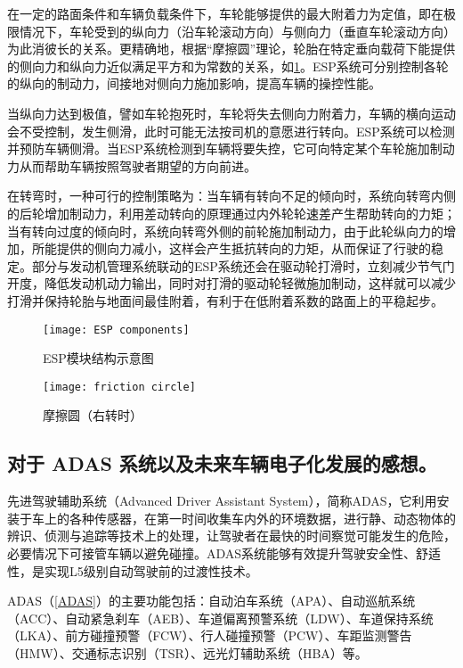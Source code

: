 \documentclass[UTF8]{ctexart}
\numberwithin{figure}{section}
\numberwithin{table}{section}
\begin{document}
在一定的路面条件和车辆负载条件下，车轮能够提供的最大附着力为定值，即在极限情况下，车轮受到的纵向力（沿车轮滚动方向）与侧向力（垂直车轮滚动方向）为此消彼长的关系。更精确地，根据“摩擦圆”理论，轮胎在特定垂向载荷下能提供的侧向力和纵向力近似满足平方和为常数的关系，如\cref{friction circle}。ESP系统可分别控制各轮的纵向的制动力，间接地对侧向力施加影响，提高车辆的操控性能。

当纵向力达到极值，譬如车轮抱死时，车轮将失去侧向力附着力，车辆的横向运动会不受控制，发生侧滑，此时可能无法按司机的意愿进行转向。ESP系统可以检测并预防车辆侧滑。当ESP系统检测到车辆将要失控，它可向特定某个车轮施加制动力从而帮助车辆按照驾驶者期望的方向前进。

在转弯时，一种可行的控制策略为：当车辆有转向不足的倾向时，系统向转弯内侧的后轮增加制动力，利用差动转向的原理通过内外轮轮速差产生帮助转向的力矩；当有转向过度的倾向时，系统向转弯外侧的前轮施加制动力，由于此轮纵向力的增加，所能提供的侧向力减小，这样会产生抵抗转向的力矩，从而保证了行驶的稳定。部分与发动机管理系统联动的ESP系统还会在驱动轮打滑时，立刻减少节气门开度，降低发动机动力输出，同时对打滑的驱动轮轻微施加制动，这样就可以减少打滑并保持轮胎与地面间最佳附着，有利于在低附着系数的路面上的平稳起步。

\begin{figure}[htbp]
	\centering
	\begin{minipage}[b]{0.59\textwidth}
		\centering
		\texttt{[image: ESP components]}
		\caption{ESP模块结构示意图}
		\label{ESP components}
	\end{minipage}
	\begin{minipage}[b]{0.4\textwidth}
		\centering
		\texttt{[image: friction circle]}
		\caption{摩擦圆（右转时）}
		\label{friction circle}
	\end{minipage}
\end{figure}

\subsection{对于 ADAS 系统以及未来车辆电子化发展的感想。}

先进驾驶辅助系统（Advanced Driver Assistant System），简称ADAS，它利用安装于车上的各种传感器，在第一时间收集车内外的环境数据，进行静、动态物体的辨识、侦测与追踪等技术上的处理，让驾驶者在最快的时间察觉可能发生的危险，必要情况下可接管车辆以避免碰撞。ADAS系统能够有效提升驾驶安全性、舒适性，是实现L5级别自动驾驶前的过渡性技术。

ADAS（\cref{ADAS}）的主要功能包括：自动泊车系统（APA）、自动巡航系统（ACC）、自动紧急刹车（AEB）、车道偏离预警系统（LDW）、车道保持系统（LKA）、前方碰撞预警（FCW）、行人碰撞预警（PCW）、车距监测警告（HMW）、交通标志识别（TSR）、远光灯辅助系统（HBA）等。
\end{document}
